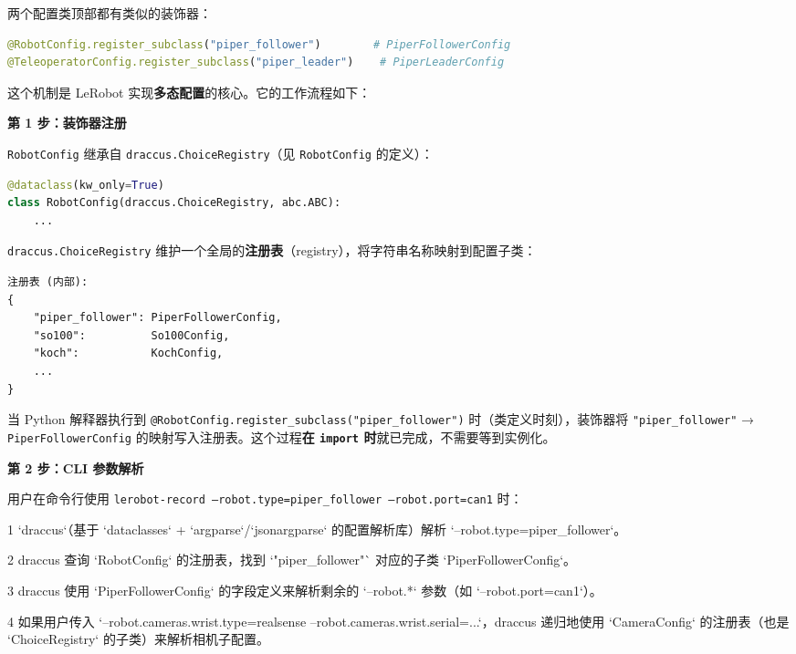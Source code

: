 \documentclass[UTF8,a4paper,11pt]{ctexart}
\begin{document}
{两个配置类顶部都有类似的装饰器：

\begin{lstlisting}[language=python]
@RobotConfig.register_subclass("piper_follower")        # PiperFollowerConfig
@TeleoperatorConfig.register_subclass("piper_leader")    # PiperLeaderConfig
\end{lstlisting}

这个机制是 LeRobot 实现\textbf{多态配置}的核心。它的工作流程如下：

\textbf{第 1 步：装饰器注册}

\texttt{RobotConfig} 继承自 \texttt{draccus.ChoiceRegistry}（见 \texttt{RobotConfig} 的定义）：

\begin{lstlisting}[language=python]
@dataclass(kw_only=True)
class RobotConfig(draccus.ChoiceRegistry, abc.ABC):
    ...
\end{lstlisting}

\texttt{draccus.ChoiceRegistry} 维护一个全局的\textbf{注册表}（registry），将字符串名称映射到配置子类：

\begin{lstlisting}[language=text]
注册表 (内部):
{
    "piper_follower": PiperFollowerConfig,
    "so100":          So100Config,
    "koch":           KochConfig,
    ...
}
\end{lstlisting}

当 Python 解释器执行到 \texttt{@RobotConfig.register_subclass("piper_follower")} 时（类定义时刻），装饰器将 \texttt{"piper_follower"} → \texttt{PiperFollowerConfig} 的映射写入注册表。这个过程\textbf{在 \texttt{import} 时}就已完成，不需要等到实例化。

\textbf{第 2 步：CLI 参数解析}

用户在命令行使用 \texttt{lerobot-record --robot.type=piper_follower --robot.port=can1} 时：

\item[1] `draccus`（基于 `dataclasses` + `argparse`/`jsonargparse` 的配置解析库）解析 `--robot.type=piper_follower`。
\item[2] draccus 查询 `RobotConfig` 的注册表，找到 `"piper_follower"` 对应的子类 `PiperFollowerConfig`。
\item[3] draccus 使用 `PiperFollowerConfig` 的字段定义来解析剩余的 `--robot.*` 参数（如 `--robot.port=can1`）。
\item[4] 如果用户传入 `--robot.cameras.wrist.type=realsense --robot.cameras.wrist.serial=...`，draccus 递归地使用 `CameraConfig` 的注册表（也是 `ChoiceRegistry` 的子类）来解析相机子配置。

}
\end{document}
